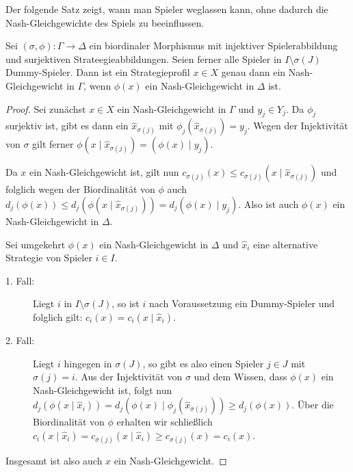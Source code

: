 Der folgende Satz zeigt, wann man Spieler weglassen kann, ohne dadurch die Nash-Gleichgewichte des Spiels zu beeinflussen.

\begin{satz}\label{prop:DummySpielerWeglassen}
	Sei $(\sigma, \phi): \Gamma \to \Delta$ ein biordinaler Morphismus mit injektiver Spielerabbildung und surjektiven Strateegieabbildungen. Seien ferner alle Spieler in $I\setminus \sigma(J)$ Dummy-Spieler. Dann ist ein Strategieprofil $x \in X$ genau dann ein Nash-Gleichgewicht in $\Gamma$, wenn $\phi(x)$ ein Nash-Gleichgewicht in $\Delta$ ist.
\end{satz}


\begin{proof}
	Sei zunächst $x \in X$ ein Nash-Gleichgewicht in $\Gamma$ und $y_j \in Y_j$. Da $\phi_j$ surjektiv ist, gibt es dann ein $\hat{x}_{\sigma(j)}$ mit $\phi_j(\hat{x}_{\sigma(j)}) = y_j$. Wegen der Injektivität von $\sigma$ gilt ferner $\phi(x \mid \hat{x}_{\sigma(j)}) = \left(\phi(x) \mid y_j\right)$.
	
	Da $x$ ein Nash-Gleichgewicht ist, gilt nun $c_{\sigma(j)}(x) \leq c_{\sigma(j)}(x \mid \hat{x}_{\sigma(j)})$ und folglich wegen der Biordinalität von $\phi$ auch $d_j(\phi(x)) \leq d_j(\phi(x \mid \hat{x}_{\sigma(j)})) = d_j(\phi(x) \mid y_j)$. Also ist auch $\phi(x)$ ein Nash-Gleichgewicht in $\Delta$.
	
	Sei umgekehrt $\phi(x)$ ein Nash-Gleichgewicht in $\Delta$ und $\hat{x}_i$ eine alternative Strategie von Spieler $i \in I$. 
	\begin{description}
		\item[1. Fall:] Liegt $i$ in $I\setminus \sigma(J)$, so ist $i$ nach Voraussetzung ein Dummy-Spieler und folglich gilt: $c_i(x) = c_i(x \mid \hat{x}_i)$.
		\item[2. Fall:] Liegt $i$ hingegen in $\sigma(J)$, so gibt es also einen Spieler $j \in J$ mit $\sigma(j) = i$. Aus der Injektivität von $\sigma$ und dem Wissen, dass $\phi(x)$ ein Nash-Gleichgewicht ist, folgt nun $d_j(\phi(x \mid \hat{x}_i)) = d_j(\phi(x) \mid \phi_j(\hat{x}_{\sigma(j)})) \geq d_j(\phi(x))$. Über die Biordinalität von $\phi$ erhalten wir schließlich $c_i(x \mid \hat{x}_i) = c_{\sigma(j)}(x \mid \hat{x}_i) \geq c_{\sigma(j)}(x) = c_i(x)$. 
	\end{description}
	Insgesamt ist also auch $x$ ein Nash-Gleichgewicht.
\end{proof}

